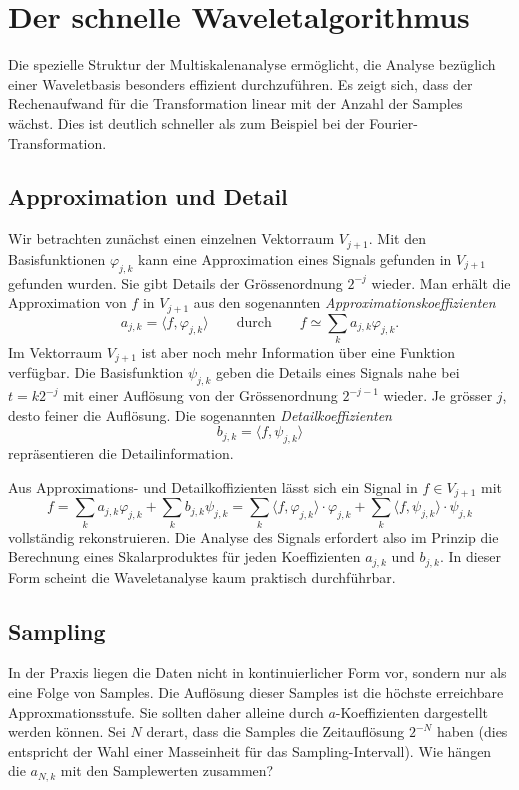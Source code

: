 %
%
%
\section{Der schnelle Waveletalgorithmus
\label{section:fast}}
Die spezielle Struktur der Multiskalenanalyse ermöglicht, die Analyse
bezüglich einer Waveletbasis besonders effizient durchzuführen.
Es zeigt sich, dass der Rechenaufwand für die Transformation linear
mit der Anzahl der Samples wächst.
Dies ist deutlich schneller als zum Beispiel bei der Fourier-Transformation.

\subsection{Approximation und Detail}
Wir betrachten zunächst einen einzelnen Vektorraum $V_{j+1}$.
Mit den Basisfunktionen $\varphi_{j,k}$ kann eine Approximation
eines Signals gefunden in $V_{j+1}$ gefunden wurden.
Sie gibt Details der Grössenordnung $2^{-j}$ wieder.
Man erhält die Approximation von $f$ in $V_{j+1}$ aus den sogenannten
{\em Approximationskoeffizienten}
%
\[
a_{j,k} = \langle f,\varphi_{j,k}\rangle
\qquad\text{durch}\qquad
f\simeq \sum_{k} a_{j,k} \varphi_{j,k}.
\]
Im Vektorraum $V_{j+1}$ ist aber noch mehr Information über eine Funktion
verfügbar.
Die Basisfunktion $\psi_{j,k}$ geben die Details eines Signals nahe bei
$t=k2^{-j}$ mit einer Auflösung von der Grössenordnung $2^{-j-1}$ wieder.
Je grösser $j$, desto feiner die Auflösung.
Die sogenannten {\em Detailkoeffizienten}
%
\[
b_{j,k} = \langle f,\psi_{j,k}\rangle
\]
repräsentieren die Detailinformation.

Aus Approximations- und Detailkoffizienten lässt sich ein Signal in
$f\in V_{j+1}$ mit 
\[
f
=
\sum_{k} a_{j,k}\varphi_{j,k} + \sum_k b_{j,k}\psi_{j,k}
=
\sum_{k} \langle f,\varphi_{j,k}\rangle\cdot \varphi_{j,k}
+
\sum_k \langle f,\psi_{j,k}\rangle\cdot \psi_{j,k}
\]
vollständig rekonstruieren.
Die Analyse des Signals erfordert also im Prinzip die Berechnung eines
Skalarproduktes für jeden Koeffizienten $a_{j,k}$ und $b_{j,k}$.
In dieser Form scheint die Waveletanalyse kaum praktisch durchführbar.

\subsection{Sampling}
In der Praxis liegen die Daten nicht in kontinuierlicher Form vor, sondern
nur als eine Folge von Samples.
Die Auflösung dieser Samples ist die höchste erreichbare Approxmationsstufe.
Sie sollten daher alleine durch $a$-Koeffizienten dargestellt werden können.
Sei $N$ derart, dass die Samples die Zeitauflösung $2^{-N}$ haben (dies
entspricht der Wahl einer Masseinheit für das Sampling-Intervall).
Wie hängen die $a_{N,k}$ mit den Samplewerten zusammen?

